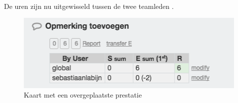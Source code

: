 \noindent
\\De uren zijn nu uitgewisseld tussen de twee teamleden .

\begin{figure}[h]
	\centering
	\includegraphics[scale=0.55]{./afbeeldingen/overgezette_prestatie.png}
	\caption{Kaart met een overgeplaatste prestatie}
	\label{fig:overgezette_prestatie}	
\end{figure} 

